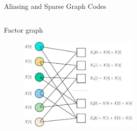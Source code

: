 \begin{frame}{Aliasing and Sparse Graph Codes}
\begin{columns}
			\begin{block}{\small Factor graph}
				\begin{figure}[t]
					\centering
					\includegraphics[width=2.3in]{./Figures/Factorgraph_example}
				\end{figure}
			\end{block}
		\end{columns}
	\end{frame}
	
	
	
